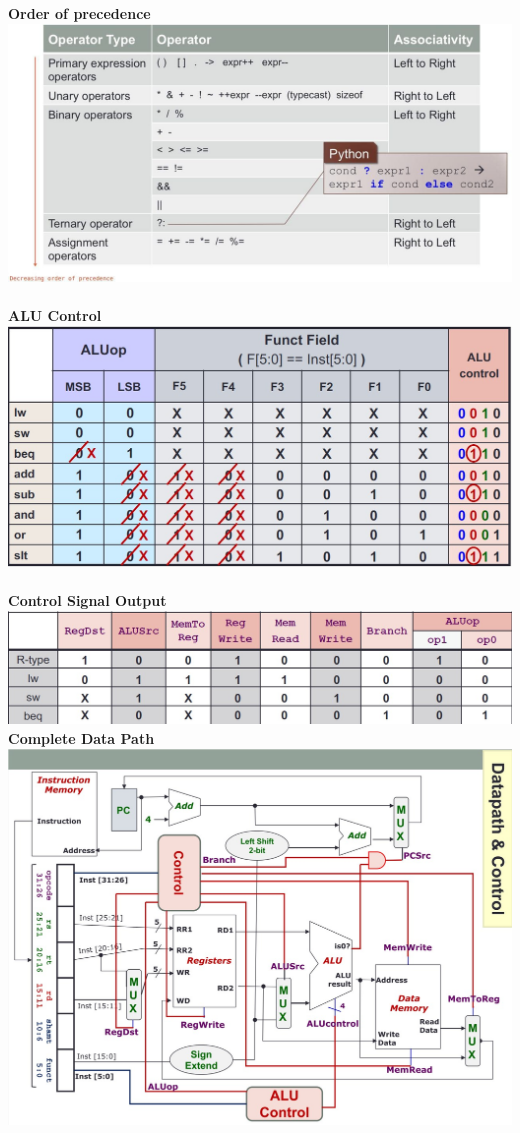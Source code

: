 \documentclass[10pt,landscape,a4paper]{article}
\begin{document}
\begin{multicols*}{3}
\textbf{Order of precedence}\\
\includegraphics[scale=0.22]{order_of_precedence.jpg}\\\\
\textbf{ALU Control}\\
\includegraphics[scale=0.36]{alucontrol.jpg}\\\\
\textbf{Control Signal Output}\\
\includegraphics[scale=0.35]{control_signal_output.jpg}
\textbf{Complete Data Path}\\
\includegraphics[scale=0.32]{datapath.jpg}\\\\

\end{multicols*}
\end{document}
